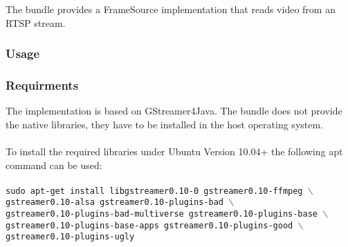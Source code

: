 
The bundle provides a FrameSource implementation that reads video from an RTSP stream.

\subsubsection{Usage}

\subsubsection{Requirments}

The implementation is based on GStreamer4Java. The bundle does not provide the native libraries, they have to be installed in the host operating system.
\\~\\
To install the required libraries under Ubuntu Version 10.04+ the following apt command can be used:
\\~\\
\texttt{sudo apt-get install libgstreamer0.10-0 gstreamer0.10-ffmpeg $\backslash$ \\
gstreamer0.10-alsa gstreamer0.10-plugins-bad $\backslash$ \\
gstreamer0.10-plugins-bad-multiverse gstreamer0.10-plugins-base $\backslash$ \\
gstreamer0.10-plugins-base-apps gstreamer0.10-plugins-good $\backslash$ \\
gstreamer0.10-plugins-ugly}
